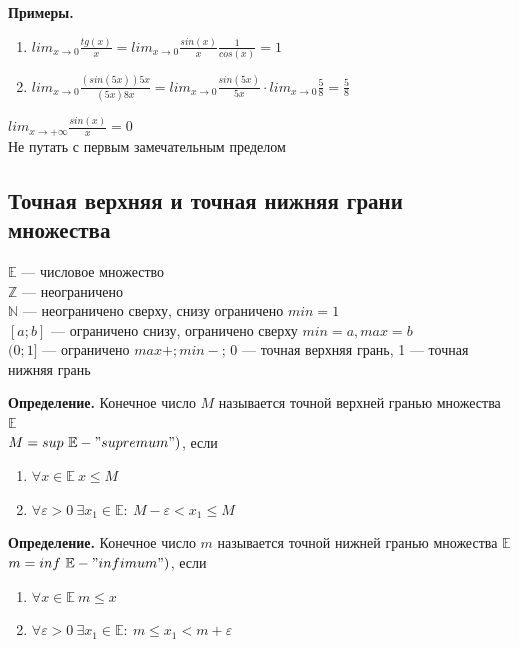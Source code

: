 \documentclass{article}
\begin{document}
    \textbf{Примеры.}

    \begin{enumerate}
        \item \( lim_{x \rightarrow 0} \frac{tg(x)}{x} = lim_{x \rightarrow 0} \frac{sin(x)}{x}\frac{1}{cos(x)} = 1 \)
        \item \( lim_{x \rightarrow 0} \frac{(sin(5x)) 5x}{(5x) 8x} = lim_{x \rightarrow 0} \frac{sin(5x)}{5x} \cdot lim_{x \rightarrow 0} \frac{5}{8} = \frac{5}{8}\)
    \end{enumerate}
    
    \( lim_{x \rightarrow +\infty} \frac{sin(x)}{x} = 0\)\\
    Не путать с первым замечательным пределом

    \subsection{Точная верхняя и точная нижняя грани множества}
    \( \mathbb{E} \) --- числовое множество\\
    \( \mathbb{Z} \) --- неограничено\\
    \( \mathbb{N} \) --- неограничено сверху, снизу ограничено \( min = 1 \)\\
    \( [a; b] \) --- ограничено снизу, ограничено сверху \( min = a, max = b \)\\
    \( (0; 1] \) --- ограничено \( max +;  min - \); 0 --- точная верхняя грань, 1 --- точная нижняя грань

    \textbf{Определение.} Конечное число \(M\) называется точной верхней гранью множества \(\mathbb{E}\)\\ 
    \(M = sup\ \mathbb{E} - "supremum")\), если
    \begin{enumerate}
        \item \( \forall x \in \mathbb{E}\ x \leq M \)
        \item \( \forall \varepsilon > 0\ \exists x_1 \in \mathbb{E}:\ M - \varepsilon < x_1 \leq M \)
    \end{enumerate}
    
    \textbf{Определение.} Конечное число \(m\) называется точной нижней гранью множества \(\mathbb{E}\)\\
    \(m = inf\ \mathbb{E} - "infimum")\), если
    \begin{enumerate}
        \item \( \forall x \in \mathbb{E}\ m \leq x \)
        \item \( \forall \varepsilon > 0\ \exists x_1 \in \mathbb{E}:\ m \leq x_1 < m + \varepsilon \)
    \end{enumerate}
\end{document}
